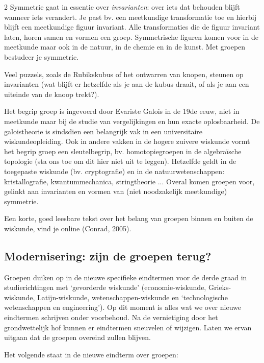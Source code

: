 \begin{multicols}{2}
	Symmetrie gaat in essentie over \emph{invarianten}: over iets dat behouden blijft wanneer iets verandert. Je past bv. een meetkundige transformatie toe en hierbij blijft een meetkundige figuur invariant. Alle transformaties die de figuur invariant laten, horen samen en vormen een groep. Symmetrische figuren komen voor in de meetkunde maar ook in de natuur, in de chemie en in de kunst. Met groepen bestudeer je symmetrie.
	
	Veel puzzels, zoals de Rubikskubus of het ontwarren van knopen, steunen op invarianten (wat blijft er hetzelfde als je aan de kubus draait, of als je aan een uiteinde van de knoop trekt?). 
	
	Het begrip groep is ingevoerd door Evariste Galois in de 19de eeuw, niet in meetkunde maar bij de studie van vergelijkingen en hun exacte oplosbaarheid. De galoistheorie is sindsdien een belangrijk vak in een universitaire wiskundeopleiding. Ook in andere vakken in de hogere zuivere wiskunde vormt het begrip groep een sleutelbegrip, bv. homotopiegroepen in de algebraïsche topologie (sta ons toe om dit hier niet uit te leggen). Hetzelfde geldt in de  toegepaste wiskunde (bv. cryptografie) en in de natuurwetenschappen: kristallografie, kwantummechanica, stringtheorie ... Overal komen groepen voor, gelinkt aan invarianten en vormen van (niet noodzakelijk meetkundige) symmetrie.
	
	Een korte, goed leesbare tekst over het belang van groepen binnen en buiten de wiskunde, vind je online (Conrad, 2005).
	
	\subsection*{Modernisering: zijn de groepen terug?}
	
	Groepen duiken op in de nieuwe specifieke eindtermen voor de derde graad in studierichtingen met `gevorderde wiskunde' (economie-wiskunde, Grieks-wiskunde, Latijn-wiskunde, wetenschappen-wiskunde en `technologische wetenschappen en engineering'). Op dit moment is alles wat we over nieuwe eindtermen schrijven onder voorbehoud. Na de vernietiging door het grondwettelijk hof kunnen er eindtermen sneuvelen of wijzigen. Laten we ervan uitgaan dat de groepen overeind zullen blijven.
	
	Het volgende staat in de nieuwe eindterm over groepen:
	

\end{multicols}
